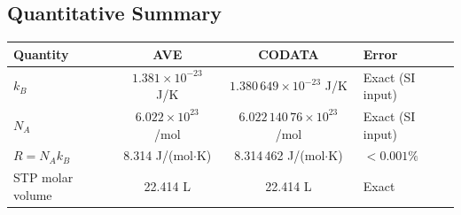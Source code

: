 \subsection*{Quantitative Summary}
\begin{center}
\small
\renewcommand{\arraystretch}{1.2}
\begin{tabular}{lccl}
\toprule
\textbf{Quantity} & \textbf{AVE} & \textbf{CODATA} & \textbf{Error} \\
\midrule
$k_B$              & $1.381 \times 10^{-23}$ J/K & $1.380\,649 \times 10^{-23}$ J/K & Exact (SI input) \\
$N_A$              & $6.022 \times 10^{23}$ /mol & $6.022\,140\,76 \times 10^{23}$ /mol & Exact (SI input) \\
$R = N_A k_B$      & 8.314 J/(mol$\cdot$K) & 8.314\,462 J/(mol$\cdot$K) & $< 0.001\%$ \\
STP molar volume    & 22.414 L & 22.414 L & Exact \\
\bottomrule
\end{tabular}
\end{center}
